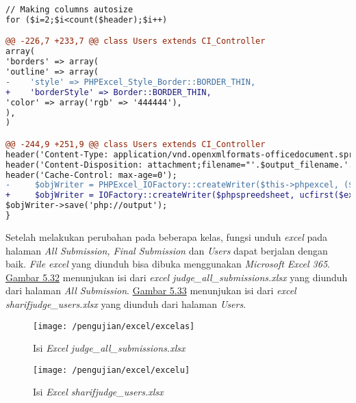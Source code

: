 \begin{lstlisting}[language=diff, caption=Perubahan kode program pada \textit{Users.php}, label=lstt:9, basicstyle=\ttfamily, frame=single,
columns=fullflexible, keepspaces=true, breaklines=true]
// Making columns autosize
for ($i=2;$i<count($header);$i++)

@@ -226,7 +233,7 @@ class Users extends CI_Controller
array(
'borders' => array(
'outline' => array(
-    'style' => PHPExcel_Style_Border::BORDER_THIN,
+    'borderStyle' => Border::BORDER_THIN,
'color' => array('rgb' => '444444'),
),
)

@@ -244,9 +251,9 @@ class Users extends CI_Controller
header('Content-Type: application/vnd.openxmlformats-officedocument.spreadsheetml.sheet');
header('Content-Disposition: attachment;filename="'.$output_filename.'.'.$ext.'"');
header('Cache-Control: max-age=0');
-     $objWriter = PHPExcel_IOFactory::createWriter($this->phpexcel, ($ext==='xlsx'?'Excel2007':'Excel5'));
+     $objWriter = IOFactory::createWriter($phpspreedsheet, ucfirst($ext));
$objWriter->save('php://output');
}
\end{lstlisting}

	Setelah melakukan perubahan pada beberapa kelas, fungsi unduh \textit{excel} pada halaman \textit{All Submission, Final Submission} dan \textit{Users} dapat berjalan dengan baik. \textit{File excel} yang diunduh bisa dibuka menggunakan \textit{Microsoft Excel 365}. \hyperref[fig:excelas]{Gambar 5.32} menunjukan isi dari \textit{excel judge\_all\_submissions.xlsx} yang diunduh dari halaman \textit{All Submission}. \hyperref[fig:excelu]{Gambar 5.33} menunjukan isi dari \textit{excel sharifjudge\_users.xlsx} yang diunduh dari halaman \textit{Users}.
	\begin{figure}[H]
		\centering  
		\texttt{[image: /pengujian/excel/excelas]}  
		\caption[Isi \textit{Excel judge\_all\_submissions.xlsx}]{Isi \textit{Excel judge\_all\_submissions.xlsx}} 
		\label{fig:excelas} 
	\end{figure}
	
	\begin{figure}[H]
		\centering  
		\texttt{[image: /pengujian/excel/excelu]}  
		\caption[Isi \textit{Excel sharifjudge\_users.xlsx}]{Isi \textit{Excel sharifjudge\_users.xlsx}} 
		\label{fig:excelu} 
	\end{figure}


